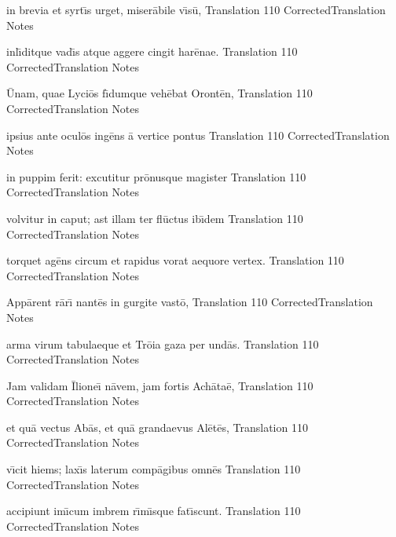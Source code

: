 \documentclass[]{article}
\begin{document}
\latline
  {in brevia et syrt\={\macron \i}s urget, miser\={\macron a}bile v\={\macron \i}s\={\macron u},}
  { Translation }
  {110}
  { CorrectedTranslation }
  { Notes }


\latline
  {inl\={\macron \i}ditque vad\={\macron \i}s atque aggere cingit har\={\macron e}nae.}
  { Translation }
  {110}
  { CorrectedTranslation }
  { Notes }


\newpage

\latline
  {\={\macron U}nam, quae Lyci\={\macron o}s f\={\macron \i}dumque veh\={\macron e}bat Oront\={\macron e}n,}
  { Translation }
  {110}
  { CorrectedTranslation }
  { Notes }


\latline
  {ipsius ante ocul\={\macron o}s ing\={\macron e}ns \={\macron a} vertice pontus}
  { Translation }
  {110}
  { CorrectedTranslation }
  { Notes }


\latline
  {in puppim ferit:  excutitur pr\={\macron o}nusque magister}
  { Translation }
  {110}
  { CorrectedTranslation }
  { Notes }


\newpage

\latline
  {volvitur in caput; ast illam ter fl\={\macron u}ctus ib\={\macron \i}dem}
  { Translation }
  {110}
  { CorrectedTranslation }
  { Notes }


\latline
  {torquet ag\={\macron e}ns circum et rapidus vorat aequore vertex.}
  { Translation }
  {110}
  { CorrectedTranslation }
  { Notes }


\latline
  {App\={\macron a}rent r\={\macron a}r\={\macron \i} nant\={\macron e}s in gurgite vast\={\macron o},}
  { Translation }
  {110}
  { CorrectedTranslation }
  { Notes }


\newpage

\latline
  {arma virum tabulaeque et Tr\={\macron o}ia gaza per und\={\macron a}s.}
  { Translation }
  {110}
  { CorrectedTranslation }
  { Notes }


\latline
  {Jam validam \={\macron I}lione\={\macron \i} n\={\macron a}vem, jam fortis Ach\={\macron a}ta\={\macron e},}
  { Translation }
  {110}
  { CorrectedTranslation }
  { Notes }


\latline
  {et qu\={\macron a} vectus Ab\={\macron a}s, et qu\={\macron a} grandaevus Al\={\macron e}t\={\macron e}s,}
  { Translation }
  {110}
  { CorrectedTranslation }
  { Notes }


\newpage

\latline
  {v\={\macron \i}cit hiems; lax\={\macron \i}s laterum comp\={\macron a}gibus omn\={\macron e}s}
  { Translation }
  {110}
  { CorrectedTranslation }
  { Notes }


\latline
  {accipiunt im\={\macron \i}cum imbrem r\={\macron \i}m\={\macron \i}sque fat\={\macron \i}scunt.}
  { Translation }
  {110}
  { CorrectedTranslation }
  { Notes }
\end{document}
